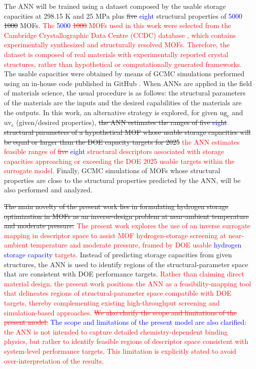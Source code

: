 \documentclass[review]{elsarticle}
\newcommand{\ugc}{\mathrm{ug_c}}
\newcommand{\uvc}{\mathrm{uv_c}}
\begin{document}
The ANN will be trained using a dataset composed by the usable storage 
capacities at 298.15 K and 25 MPa plus \sout{five} \textcolor{blue}{eight} 
structural properties of \textcolor{blue}{5000} \sout{1000} MOFs. 
\textcolor{red}{The \textcolor{blue}{5000} \sout{1000} MOFs used in this 
work were selected from the 
Cambridge Crystallographic Data Centre (CCDC) database \cite{ccdc,mlwt+17}, 
which contains experimentally synthesized and structurally resolved MOFs. 
Therefore, the dataset is composed of real materials with experimentally 
reported crystal structures, rather than hypothetical or computationally 
generated frameworks.} The usable capacities were obtained by means of GCMC 
simulations performed using an in-house code published in GitHub \cite{mcmgs}. 
When ANNs are applied in the field of materials science, the usual procedure is 
as follows: the structural parameters of the materials are the inputs and the 
desired capabilities of the materials are the outputs.  In this work, an 
alternative strategy is explored, for given $\ugc$ and $\uvc$ (given/desired 
properties), \sout{the ANN estimates the ranges of \sout{five} 
\textcolor{blue}{eight} structural parameters 
of a hypothetical MOF whose usable storage capacities will be equal or larger 
than the DOE capacity targets for 2025} \textcolor{red}{the ANN estimates 
feasible ranges of \sout{five} \textcolor{blue}{eight} structural descriptors 
associated with storage 
capacities approaching or exceeding the DOE 2025 usable targets within the 
surrogate model.} Finally, GCMC simulations of MOFs whose structural properties 
are close to the structural properties predicted by the ANN, will be also 
performed and analyzed. 
 
\sout{The main novelty of the present work lies in formulating hydrogen storage 
optimization in MOFs as an inverse-design problem at near-ambient temperature 
and moderate pressure.} \textcolor{red}{The present work explores the use of an 
inverse surrogate mapping in descriptor space to assist MOF hydrogen-storage 
screening at near-ambient temperature and moderate pressure, framed by DOE 
usable \textcolor{blue}{hydrogen storage capacity} targets.} Instead of predicting storage capacities from given 
structures, the ANN is used to identify regions of the structural-parameter 
space that are consistent with DOE performance targets. \textcolor{red}{Rather 
than claiming direct material design, the present work positions the ANN as a 
feasibility-mapping tool that delineates regions of structural-parameter space 
compatible with DOE targets, thereby complementing existing high-throughput 
screening and simulation-based approaches.} \textcolor{red}{\sout{We also 
clarify the scope and limitations of the present model:} \textcolor{blue}{The 
scope and limitations of the present model are also clarified:} the ANN is not 
intended to capture detailed chemistry-dependent binding physics, but rather to 
identify feasible regions of descriptor space consistent with system-level 
performance targets. This limitation is explicitly stated to avoid 
over-interpretation of the results.}
\end{document}
